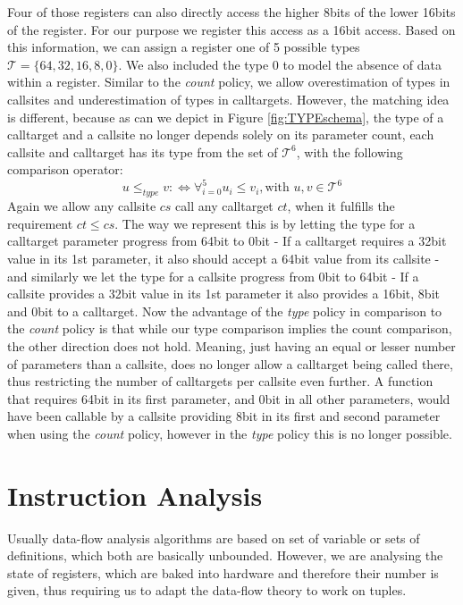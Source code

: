 Four of those registers can also directly access the higher 8bits of the lower 16bits of the register. For our purpose we register this access as a 16bit access. Based on this information, we can assign a register one of 5 possible types $\mathcal{T} = \{64, 32, 16, 8, 0\}$. We also included the type 0 to model the absence of data within a register. Similar to the \emph{count} policy, we allow overestimation of types in callsites and underestimation of types in calltargets. However, the matching idea is different, because as can we depict in Figure \ref{fig:TYPEschema}, the type of a calltarget and a callsite no longer depends solely on its parameter count, each callsite and calltarget has its type from the set of $\mathcal{T}^6$, with the following comparison operator:
\[
	u \leq_{type} v :\Longleftrightarrow  \forall_{i = 0}^{5} {u_i \leq v_i} , \text {with } u, v \in \mathcal{T}^6
\]
Again we allow any callsite $cs$ call any calltarget $ct$, when it fulfills the requirement $ct \leq cs$. The way we represent this is by letting the type for a calltarget parameter progress from 64bit to 0bit - If a calltarget requires a 32bit value in its 1st parameter, it also should accept a 64bit value from its callsite - and similarly we let the type for a callsite progress from 0bit to 64bit - If a callsite provides a 32bit value in its 1st parameter it also provides a 16bit, 8bit and 0bit to a calltarget. Now the advantage of the \emph{type} policy in comparison to the \emph{count} policy is that while our type comparison implies the count comparison, the other direction does not hold. Meaning, just having an equal or lesser number of parameters than a callsite, does no longer allow a calltarget being called there, thus restricting the number of calltargets per callsite even further. A function that requires 64bit in its first parameter, and 0bit in all other parameters, would have been callable by a callsite providing 8bit in its first and second parameter when using the \emph{count} policy, however in the \emph{type} policy this is no longer possible.


\section{Instruction Analysis}
\label{section:instructionanalysis}
Usually data-flow analysis algorithms are based on set of variable or sets of definitions, which both are basically unbounded. However, we are analysing the state of registers, which are baked into hardware and therefore their number is given, thus requiring us to adapt the data-flow theory to work on tuples.

